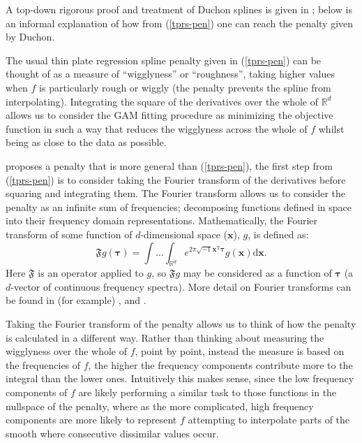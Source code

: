 A top-down rigorous proof and treatment of Duchon splines is given in \cite{duchon77}; below is an informal explanation of how from (\ref{tprs-pen}) one can reach the penalty given by Duchon. 

The usual thin plate regression spline penalty given in (\ref{tprs-pen}) can be thought of as a measure of ``wigglyness'' or ``roughness'', taking higher values when $f$ is particularly rough or wiggly (the penalty prevents the spline from interpolating). Integrating the square of the derivatives over the whole of $\mathbb{R}^d$ allows us to consider the GAM fitting procedure as minimizing the objective function in such a way that reduces the wigglyness across the whole of $f$ whilst being as close to the data as possible. 

\cite{duchon77} proposes a penalty that is more general than (\ref{tprs-pen}), the first step from (\ref{tprs-pen}) is to consider taking the Fourier transform of the derivatives before squaring and integrating them. The Fourier transform allows us to consider the penalty as an infinite sum of frequencies; decomposing functions defined in space into their frequency domain representations. Mathematically, the Fourier transform of some function of $d$-dimensional space ($\mathbf{x}$), $g$, is defined as:
\begin{equation*}
\mathfrak{F} g(\boldsymbol{\tau}) = \int \ldots \int_{\mathbb{R}^d} e^{2 \pi \sqrt{-1} \mathbf{x}^\text{T} \boldsymbol{\tau}} g(\mathbf{x}) \text{d}\mathbf{x}.
\end{equation*}
Here $\mathfrak{F}$ is an operator applied to $g$, so $\mathfrak{F}g$ may be considered as a function of $\boldsymbol{\tau}$ (a $d$-vector of continuous frequency spectra). More detail on Fourier transforms can be found in (for example) \cite{bracewell}, \cite{chu-ft} and \cite{beerends}. 

Taking the Fourier transform of the penalty allows us to think of how the penalty is calculated in a different way. Rather than thinking about measuring the wigglyness over the whole of $f$, point by point, instead the measure is based on the frequencies of $f$, the higher the frequency components contribute more to the integral than the lower ones. Intuitively this makes sense, since the low frequency components of $f$ are likely performing a similar task to those functions in the nullspace of the penalty, where as the more complicated, high frequency components are more likely to represent $f$ attempting to interpolate parts of the smooth where consecutive dissimilar values occur.

